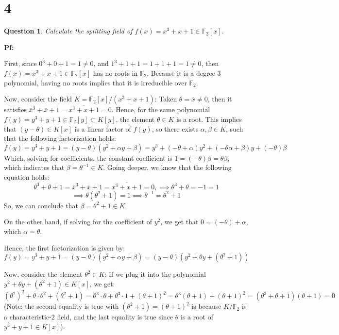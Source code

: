 \documentclass{article}
\newtheorem{question}{Question}
\begin{document}
\break

\section*{4}
\begin{myBox}[]{}
    \begin{question}
        Calculate the splitting field of $f(x)=x^3+x+1\in\mathbb{F}_2[x]$.
    \end{question}
\end{myBox}

\textbf{Pf:}

First, since $0^3+0+1 = 1 \neq 0$, and $1^3+1+1 = 1+1+1 = 1\neq 0$, then $f(x)=x^3+x+1\in\mathbb{F}_2[x]$ has no roots in $\mathbb{F}_2$. Because it is a degree $3$ polynomial, having no roots implies that it is irreducible over $\mathbb{F}_2$.

Now, consider the field $K=\mathbb{F}_2[x]/(x^3+x+1)$: Taken $\theta=\overline{x}\neq 0$, then it satisfies $\overline{x}^3 +\overline{x}+1 = \overline{x^3+x+1} = 0$. Hence, for the same polynomial $f(y)=y^3+y+1\in \mathbb{F}_2[y]\subset K[y]$, the element $\theta\in K$ is a root. This implies that $(y-\theta)\in K[x]$ is a linear factor of $f(y)$, so there exists $\alpha,\beta\in K$, such that the following factorization holds:
$$f(y)=y^3+y+1 = (y-\theta)(y^2+\alpha y + \beta) = y^3 + (-\theta+\alpha)y^2 + (-\theta\alpha+\beta)y + (-\theta)\beta$$
Which, solving for coefficients, the constant coefficient is $1 = (-\theta)\beta = \theta\beta$, which indicates that $\beta = \theta^{-1}\in K$. Going deeper, we know that the following equation holds:
$$\theta^3 + \theta +1 = \overline{x}^3+\overline{x}+1 = \overline{x^3+x+1}=0,\implies \theta^3+\theta = -1 = 1$$
$$\implies \theta(\theta^2+1)=1\implies \theta^{-1} = \theta^2+1$$
So, we can conclude that $\beta = \theta^2+1\in K$.

On the other hand, if solving for the coefficient of $y^2$, we get that $0 = (-\theta) + \alpha$, which $\alpha =\theta$. 

Hence, the first factorization is given by:
$$f(y)=y^3+y+1 = (y-\theta)(y^2+\alpha y+\beta)= (y-\theta)(y^2+\theta y + (\theta^2+1))$$

\hfil

Now, consider the element $\theta^2 \in K$: If we plug it into the polynomial $y^2+\theta y + (\theta^2+1)\in K[x]$, we get:
$$(\theta^2)^2 + \theta\cdot \theta^2 + (\theta^2+1) = \theta^3\cdot \theta + \theta^3\cdot 1 + (\theta+1)^2 = \theta^3(\theta+1)+(\theta+1)^2= (\theta^3+\theta+1)(\theta+1) = 0$$
(Note: the second equality is true with $(\theta^2+1)=(\theta+1)^2$ is because $K/\mathbb{F}_2$ is a characteristic-$2$ field, and the last equality is true since $\theta$ is a root of $y^3+y+1\in K[x]$).
\end{document}
